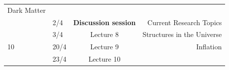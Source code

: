 \documentclass[11pt,a4paper]{book}
\begin{document}
\begin{longtable}[]{@{}llcr@{}}
\begin{minipage}[t]{0.55\columnwidth}
Dark Matter\strut
\end{minipage}\tabularnewline
\begin{minipage}[t]{0.05\columnwidth}\raggedright
\strut
\end{minipage} & \begin{minipage}[t]{0.09\columnwidth}\raggedright
2/4\strut
\end{minipage} & \begin{minipage}[t]{0.19\columnwidth}\centering
\textbf{Discussion session}\strut
\end{minipage} & \begin{minipage}[t]{0.55\columnwidth}\raggedleft
Current Research Topics\strut
\end{minipage}\tabularnewline
\begin{minipage}[t]{0.05\columnwidth}\raggedright
\strut
\end{minipage} & \begin{minipage}[t]{0.09\columnwidth}\raggedright
3/4\strut
\end{minipage} & \begin{minipage}[t]{0.19\columnwidth}\centering
Lecture 8\strut
\end{minipage} & \begin{minipage}[t]{0.55\columnwidth}\raggedleft
Structures in the Universe\strut
\end{minipage}\tabularnewline
\begin{minipage}[t]{0.05\columnwidth}\raggedright
10\strut
\end{minipage} & \begin{minipage}[t]{0.09\columnwidth}\raggedright
20/4\strut
\end{minipage} & \begin{minipage}[t]{0.19\columnwidth}\centering
Lecture 9\strut
\end{minipage} & \begin{minipage}[t]{0.55\columnwidth}\raggedleft
Inflation\strut
\end{minipage}\tabularnewline
\begin{minipage}[t]{0.05\columnwidth}\raggedright
\strut
\end{minipage} & \begin{minipage}[t]{0.09\columnwidth}\raggedright
23/4\strut
\end{minipage} & \begin{minipage}[t]{0.19\columnwidth}\centering
Lecture 10\strut
\end{minipage} & \begin{minipage}[t]{0.55\columnwidth}\raggedleft

\end{minipage}
\end{longtable}
\end{document}
